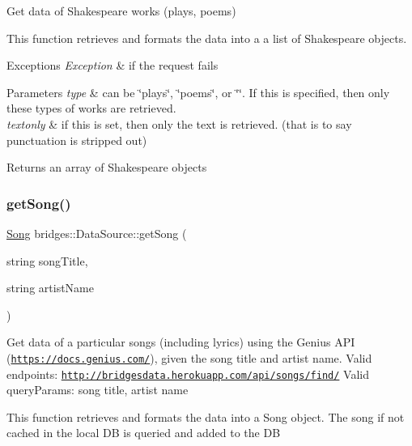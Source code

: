 Get data of Shakespeare works (plays, poems) 

This function retrieves and formats the data into a a list of Shakespeare objects.


\begin{DoxyExceptions}{Exceptions}
{\em Exception} & if the request fails\\
\hline
\end{DoxyExceptions}

\begin{DoxyParams}{Parameters}
{\em type} & can be \char`\"{}plays\char`\"{}, \char`\"{}poems\char`\"{}, or \char`\"{}\char`\"{}. If this is specified, then only these types of works are retrieved. \\
\hline
{\em textonly} & if this is set, then only the text is retrieved. (that is to say punctuation is stripped out)\\
\hline
\end{DoxyParams}
\begin{DoxyReturn}{Returns}
an array of Shakespeare objects 
\end{DoxyReturn}
\mbox{\label{classbridges_1_1_data_source_a284c9d572415b67df6989ab8ab97d0e2}} 
\subsubsection{\texorpdfstring{get\+Song()}{getSong()}}
{\footnotesize\ttfamily \mbox{\hyperlink{classbridges_1_1dataset_1_1_song}{Song}} bridges\+::\+Data\+Source\+::get\+Song (\begin{DoxyParamCaption}\item[{string}]{song\+Title,  }\item[{string}]{artist\+Name }\end{DoxyParamCaption})\hspace{0.3cm}{\ttfamily [inline]}}

Get data of a particular songs (including lyrics) using the Genius A\+PI (\href{https://docs.genius.com/}{\tt https\+://docs.\+genius.\+com/}), given the song title and artist name. Valid endpoints\+: \href{http://bridgesdata.herokuapp.com/api/songs/find/}{\tt http\+://bridgesdata.\+herokuapp.\+com/api/songs/find/} Valid query\+Params\+: song title, artist name

This function retrieves and formats the data into a Song object. The song if not cached in the local DB is queried and added to the DB


